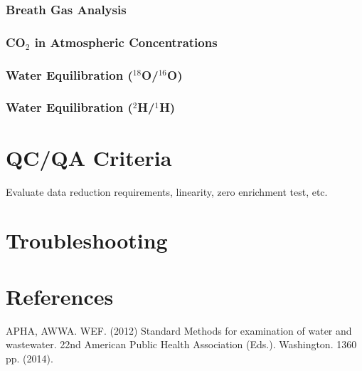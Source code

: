 \documentclass[12pt]{../SOP3_beta}\usepackage[]{graphicx}\usepackage[]{color}
\begin{document}
\subsubsection{Breath Gas Analysis}

\subsubsection{CO$_2$ in Atmospheric Concentrations}

\subsubsection{Water Equilibration ($^{18}$O/$^{16}$O)}

\subsubsection{Water Equilibration ($^2$H/$^1$H)}

\section{QC/QA Criteria}

\NP Evaluate data reduction requirements, linearity, zero enrichment test, etc.

\section{Troubleshooting}

\section{References}

\NP APHA, AWWA. WEF. (2012) Standard Methods for examination of water and wastewater. 22nd American Public Health Association (Eds.). Washington. 1360 pp. (2014).
\end{document}
